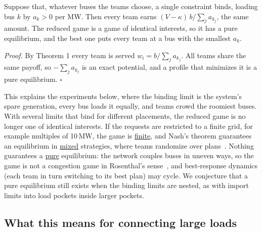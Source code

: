 \documentclass[10pt]{article}
\newcommand{\alert}[1]{{\color{alertblue}\uline{#1}}}
\newcommand{\MW}{\ensuremath{\,\mathrm{MW}}}
\begin{document}
\begin{keybox}
Suppose that, whatever buses the teams choose, a single constraint binds,
loading bus $k$ by $a_k > 0$ per MW. Then every team earns
$(V-\kappa)\, b / \sum_j a_{k_j}$, the same amount. The reduced game is a
game of identical interests, so it has a pure equilibrium, and the best one
puts every team at a bus with the smallest $a_k$.
\end{keybox}
\emph{Proof.} By Theorem 1 every team is served $w_i = b/\sum_j a_{k_j}$. All
teams share the same payoff, so $-\sum_j a_{k_j}$ is an exact potential, and a
profile that minimizes it is a pure equilibrium. $\square$

This explains the experiments below, where the binding limit is the system's
spare generation, every bus loads it equally, and teams crowd the roomiest
buses. With several limits that bind for different placements, the reduced
game is no longer one of identical interests. If the requests are restricted to
a finite grid, for example multiples of 10\MW, the game is \alert{finite}, and
Nash's theorem guarantees an equilibrium in \alert{mixed} strategies, where
teams randomize over plans~\cite{nash1950equilibrium}. Nothing guarantees a
\alert{pure} equilibrium: the network couples buses in uneven ways, so the game
is not a congestion game in Rosenthal's sense~\cite{rosenthal1973class}, and
best-response dynamics (each team in turn switching to its best plan) may cycle.
We conjecture that a pure equilibrium still exists when the binding limits are
nested, as with import limits into load pockets inside larger pockets.

\subsection{What this means for connecting large loads}
\end{document}
